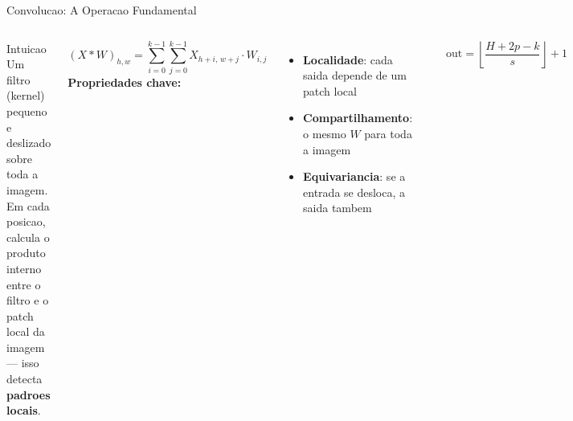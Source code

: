\documentclass[aspectratio=169, 10pt]{beamer}
\begin{document}
\begin{frame}{Convolucao: A Operacao Fundamental}
\begin{columns}
\begin{block}{Intuicao}
  Um filtro (kernel) pequeno e deslizado sobre toda a imagem.
  Em cada posicao, calcula o produto interno entre o filtro e o 
  patch local da imagem --- isso detecta \textbf{padroes locais}.
\end{block}
\[
  (X * W)_{h,w} = \sum_{i=0}^{k-1}\sum_{j=0}^{k-1} X_{h+i,\,w+j} \cdot W_{i,j}
\]
\vspace{0.3em}
\textbf{Propriedades chave:}
\begin{itemize}
  \item \textbf{Localidade}: cada saida depende de um patch local
  \item \textbf{Compartilhamento}: o mesmo $W$ para toda a imagem
  \item \textbf{Equivariancia}: se a entrada se desloca, a saida tambem
\end{itemize}

\begin{center}
\end{center}
\[ \text{out} = \left\lfloor\frac{H+2p-k}{s}\right\rfloor + 1 \]
\end{columns}
\end{frame}

\end{document}

